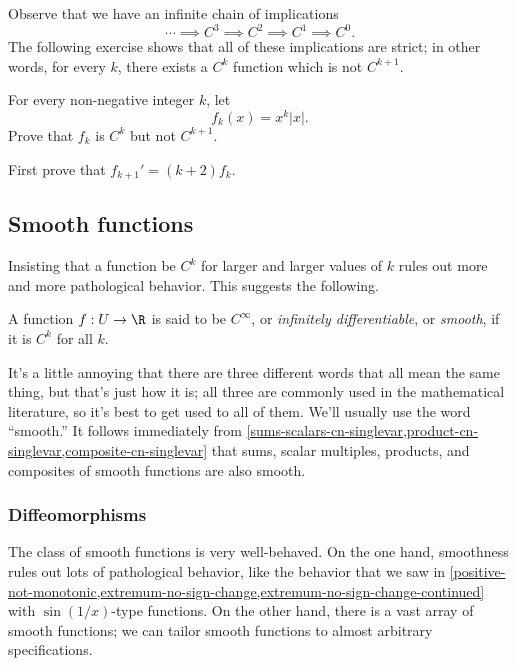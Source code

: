 Observe that we have an infinite chain of implications
\[ \dotsb \implies C^3 \implies C^2 \implies C^1 \implies C^0. \]
The following exercise shows that all of these implications are strict; in other words, for every $k$, there exists a $C^k$ function which is not $C^{k+1}$.

\begin{exercise}
	For every non-negative integer $k$, let 
	\[ f_k(x) = x^k|x|. \]
	Prove that $f_k$ is $C^k$ but not $C^{k+1}$. \begin{hint} First prove that $f_{k+1}' = (k+2)f_k$. \end{hint}
\end{exercise}

\subsection{Smooth functions} \label{smooth-single-var}

Insisting that a function be $C^k$ for larger and larger values of $k$ rules out more and more pathological behavior. This suggests the following. 

\begin{definition}
	A function $f : U \to \R$ is said to be $C^\infty$, or \emph{infinitely differentiable}, or \emph{smooth}, if it is $C^k$ for all $k$. 
\end{definition}

It's a little annoying that there are three different words that all mean the same thing, but that's just how it is; all three are commonly used in the mathematical literature, so it's best to get used to all of them. We'll usually use the word ``smooth.'' It follows immediately from \cref{sums-scalars-cn-singlevar,product-cn-singlevar,composite-cn-singlevar} that sums, scalar multiples, products, and composites of smooth functions are also smooth. 

\subsubsection*{Diffeomorphisms}

The class of smooth functions is very well-behaved. On the one hand, smoothness rules out lots of pathological behavior, like the behavior that we saw in \cref{positive-not-monotonic,extremum-no-sign-change,extremum-no-sign-change-continued} with $\sin(1/x)$-type functions. On the other hand, there is a vast array of smooth functions; we can tailor smooth functions to almost arbitrary specifications. 

